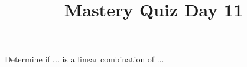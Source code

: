 \documentclass{sbgLAquiz}
\title{Mastery Quiz Day 11 }
\begin{document}
\begin{problem}[V2]
Determine if ... is a linear combination of ...
\end{problem}
\end{document}
